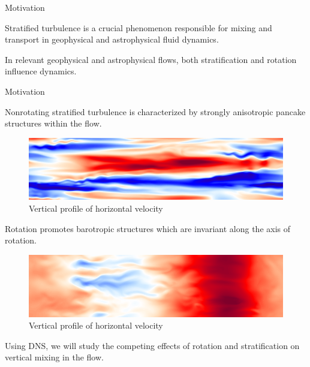 \documentclass[aspecttatio=169]{beamer}
\begin{document}
\begin{frame}{Motivation}

\begin{itemize}
{\small
\item Stratified turbulence is a crucial phenomenon responsible for mixing and
transport in geophysical and astrophysical fluid dynamics. 

\item In relevant geophysical and astrophysical flows, both stratification and
rotation influence dynamics. 
} %
\end{itemize}


\end{frame}







\begin{frame}{Motivation}
    {\footnotesize
    Nonrotating stratified turbulence is characterized by strongly
    anisotropic pancake structures within the flow. 
    \begin{figure}
        \centering
        \includegraphics[width=.9\textwidth]{images/uB100XZSlice.png}
        \caption*{\scriptsize Vertical profile of horizontal velocity}
    \end{figure}
    } %
\emp
\hspace{6pt}
    {\footnotesize
    Rotation promotes barotropic structures which are invariant along the axis
    of rotation.
    
    \begin{figure}
        \centering
        \includegraphics[width=.9\textwidth]{images/XZOm2ux.png}
        \caption*{\scriptsize Vertical profile of horizontal velocity}
    \end{figure}
    } %
\emp

\vspace{10pt}

Using DNS, we will study the competing effects of rotation and
stratification on vertical mixing in the flow. 

\end{frame}
\end{document}
